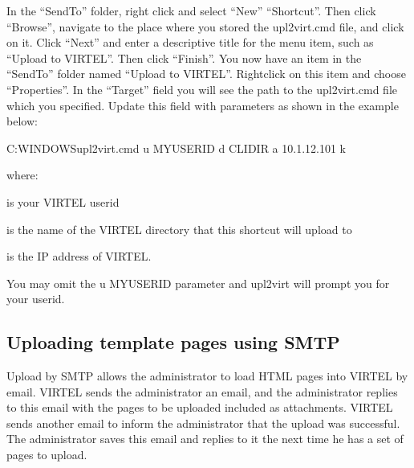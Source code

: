 \documentclass[letterpaper,10pt,english]{sphinxmanual}
\begin{document}
\sphinxAtStartPar
In the “SendTo” folder, right click and select “New” \textendash{} “Shortcut”. Then click “Browse”, navigate to the place where you stored the upl2virt.cmd file, and click on it. Click “Next” and enter a descriptive title for the menu item, such as “Upload to VIRTEL”. Then click “Finish”. You now have an item in the “SendTo” folder named “Upload to VIRTEL”. Right\sphinxhyphen{}click on this item and choose “Properties”. In the “Target” field you will see the path to the upl2virt.cmd file which you specified. Update this field with parameters as shown in the example below:

\begin{sphinxVerbatim}[commandchars=\\\{\}]
C:\PYGZbs{}WINDOWS\PYGZbs{}upl2virt.cmd \PYGZhy{}u MYUSERID \PYGZhy{}d CLI\PYGZhy{}DIR \PYGZhy{}a 10.1.12.101 \textendash{}k
\end{sphinxVerbatim}

\sphinxAtStartPar
where:
\begin{description}
\sphinxAtStartPar
is your VIRTEL userid

\sphinxAtStartPar
is the name of the VIRTEL directory that this shortcut will upload to

\sphinxAtStartPar
is the IP address of VIRTEL.

\end{description}

\sphinxAtStartPar
You may omit the \textendash{}u MYUSERID parameter and upl2virt will prompt you for your userid.

\newpage
{}\label{\detokenize{audit_operations_ and_performance:v462ap-http-uploading-pages-smtp}}
\ignorespaces 

\subsection{Uploading template pages using SMTP}
\label{\detokenize{audit_operations_ and_performance:uploading-template-pages-using-smtp}}\label{\detokenize{audit_operations_ and_performance:index-69}}
\sphinxAtStartPar
Upload by SMTP allows the administrator to load HTML pages into VIRTEL by e\sphinxhyphen{}mail. VIRTEL sends the administrator an e\sphinxhyphen{}mail, and the administrator replies to this e\sphinxhyphen{}mail with the pages to be uploaded included as attachments. VIRTEL sends another e\sphinxhyphen{}mail to inform the administrator that the upload was successful. The administrator saves this e\sphinxhyphen{}mail and replies to it the next time he has a set of pages to upload.
\end{document}
